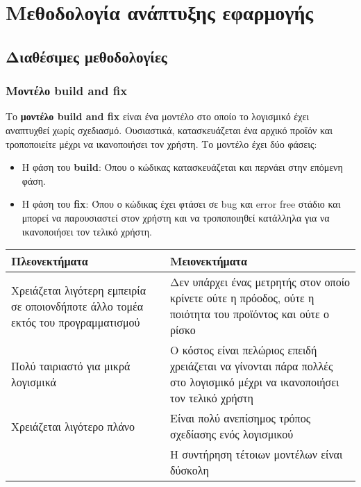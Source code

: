 \label{Chapter1}

\section{Μεθοδολογία ανάπτυξης εφαρμογής}

\subsection{Διαθέσιμες μεθοδολογίες}

\subsubsection{Μοντέλο build and fix}

Το \textbf{μοντέλο build and fix} είναι ένα μοντέλο στο οποίο το λογισμικό έχει 
αναπτυχθεί χωρίς σχεδιασμό. Ουσιαστικά, κατασκευάζεται ένα αρχικό προϊόν και τροποποιείτε
μέχρι να ικανοποιήσει τον χρήστη. Το μοντέλο έχει δύο φάσεις:

\begin{itemize}
    \item Η φάση του \textbf{build}: Όπου ο κώδικας κατασκευάζεται
    και περνάει στην επόμενη φάση.
    \item Η φάση του \textbf{fix}: Όπου ο κώδικας έχει φτάσει σε bug και 
    error free στάδιο και μπορεί να παρουσιαστεί στον χρήστη και να τροποποιηθεί 
    κατάλληλα για να ικανοποιήσει τον τελικό χρήστη. 
\end{itemize}

\begin{center}
    \begin{tabular}{| p{8cm} | p{8cm} |}
        \hline
        \textbf{Πλεονεκτήματα} & \textbf{Μειονεκτήματα} \\
        \hline
        Χρειάζεται λιγότερη εμπειρία σε οποιονδήποτε άλλο τομέα εκτός του προγραμματισμού & Δεν υπάρχει ένας μετρητής στον οποίο κρίνετε ούτε η πρόοδος, ούτε η ποιότητα του προϊόντος και ούτε ο ρίσκο \\
        \hline
        Πολύ ταιριαστό για μικρά λογισμικά &  Ο κόστος είναι πελώριος επειδή χρειάζεται να γίνονται πάρα πολλές στο λογισμικό μέχρι να ικανοποιήσει τον τελικό χρήστη \\
        \hline
        Χρειάζεται λιγότερο πλάνο & Είναι πολύ ανεπίσημος τρόπος σχεδίασης ενός λογισμικού \\
        \hline
        & Η συντήρηση τέτοιων μοντέλων είναι δύσκολη \\
        \hline
    \end{tabular}
\end{center}

